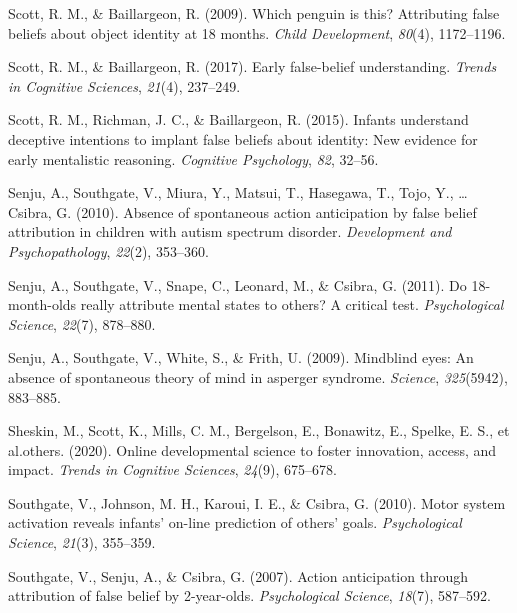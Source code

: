\documentclass[
  man,floatsintext]{apa6}
\newlength{\cslhangindent}
\newenvironment{CSLReferences}[2] %
 {\begin{list}{}{%
  \setlength{\itemindent}{0pt}
  \setlength{\leftmargin}{0pt}
  \setlength{\parsep}{0pt}
  \ifodd #1
   \setlength{\leftmargin}{\cslhangindent}
   \setlength{\itemindent}{-1\cslhangindent}
  \fi
  \setlength{\itemsep}{#2\baselineskip}}}
 {\end{list}}
\begin{document}
\begin{CSLReferences}{1}{0}
Scott, R. M., \& Baillargeon, R. (2009). Which penguin is this? Attributing false beliefs about object identity at 18 months. \emph{Child Development}, \emph{80}(4), 1172--1196.

Scott, R. M., \& Baillargeon, R. (2017). Early false-belief understanding. \emph{Trends in Cognitive Sciences}, \emph{21}(4), 237--249.

Scott, R. M., Richman, J. C., \& Baillargeon, R. (2015). Infants understand deceptive intentions to implant false beliefs about identity: New evidence for early mentalistic reasoning. \emph{Cognitive Psychology}, \emph{82}, 32--56.

Senju, A., Southgate, V., Miura, Y., Matsui, T., Hasegawa, T., Tojo, Y., \ldots{} Csibra, G. (2010). Absence of spontaneous action anticipation by false belief attribution in children with autism spectrum disorder. \emph{Development and Psychopathology}, \emph{22}(2), 353--360.

Senju, A., Southgate, V., Snape, C., Leonard, M., \& Csibra, G. (2011). Do 18-month-olds really attribute mental states to others? A critical test. \emph{Psychological Science}, \emph{22}(7), 878--880.

Senju, A., Southgate, V., White, S., \& Frith, U. (2009). Mindblind eyes: An absence of spontaneous theory of mind in asperger syndrome. \emph{Science}, \emph{325}(5942), 883--885.

Sheskin, M., Scott, K., Mills, C. M., Bergelson, E., Bonawitz, E., Spelke, E. S., et al.others. (2020). Online developmental science to foster innovation, access, and impact. \emph{Trends in Cognitive Sciences}, \emph{24}(9), 675--678.

Southgate, V., Johnson, M. H., Karoui, I. E., \& Csibra, G. (2010). Motor system activation reveals infants' on-line prediction of others' goals. \emph{Psychological Science}, \emph{21}(3), 355--359.

Southgate, V., Senju, A., \& Csibra, G. (2007). Action anticipation through attribution of false belief by 2-year-olds. \emph{Psychological Science}, \emph{18}(7), 587--592.


\end{CSLReferences}
\end{document}
